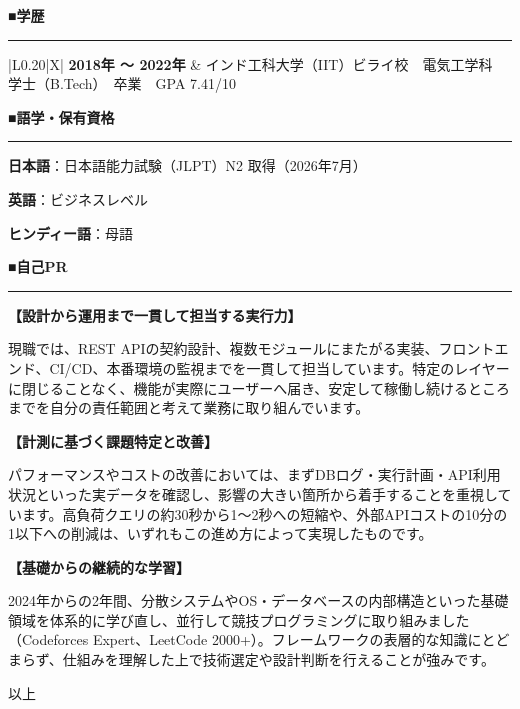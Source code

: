 \documentclass[a4paper,10pt]{ltjsarticle}
\newcommand{\jsec}[1]{%
  \par\vspace{9pt}%
  {\color{accent}\gtfamily\bfseries\large #1}\par\vspace{-5pt}%
  {\color{accent}\rule{\textwidth}{0.8pt}}\par\vspace{5pt}}
\newcommand{\skillrow}[2]{\noindent\textbf{#1}：#2\par\vspace{2pt}}
\begin{document}
\jsec{■\;学歴}
\begin{tabularx}{\textwidth}{|L{0.20\textwidth}|X|}
\hline
\textbf{2018年 〜 2022年} & インド工科大学（IIT）ビライ校　電気工学科　学士（B.Tech）　卒業　GPA 7.41/10 \\
\hline
\end{tabularx}

\jsec{■\;語学・保有資格}
\skillrow{日本語}{日本語能力試験（JLPT）N2 取得（2026年7月）}
\skillrow{英語}{ビジネスレベル}
\skillrow{ヒンディー語}{母語}

\jsec{■\;自己PR}
\textbf{【設計から運用まで一貫して担当する実行力】}\par
現職では、REST APIの契約設計、複数モジュールにまたがる実装、フロントエンド、CI/CD、本番環境の監視までを一貫して担当しています。特定のレイヤーに閉じることなく、機能が実際にユーザーへ届き、安定して稼働し続けるところまでを自分の責任範囲と考えて業務に取り組んでいます。
\vspace{4pt}

\textbf{【計測に基づく課題特定と改善】}\par
パフォーマンスやコストの改善においては、まずDBログ・実行計画・API利用状況といった実データを確認し、影響の大きい箇所から着手することを重視しています。高負荷クエリの約30秒から1〜2秒への短縮や、外部APIコストの10分の1以下への削減は、いずれもこの進め方によって実現したものです。
\vspace{4pt}

\textbf{【基礎からの継続的な学習】}\par
2024年からの2年間、分散システムやOS・データベースの内部構造といった基礎領域を体系的に学び直し、並行して競技プログラミングに取り組みました（Codeforces Expert、LeetCode 2000+）。フレームワークの表層的な知識にとどまらず、仕組みを理解した上で技術選定や設計判断を行えることが強みです。

\vspace{8pt}
\begin{flushright}
以上
\end{flushright}
\end{document}
